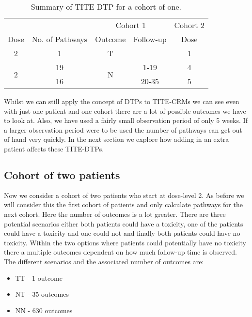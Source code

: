 \begin{table}[H]
	\centering
	\caption{Summary of TITE-DTP for a cohort of one.}
	\label{tab_tite-dtp:TITEDTP_c1_Sum}
	\begin{tabular}{ccccc}
		\hline
		\multicolumn{1}{l}{} &                 & \multicolumn{2}{c}{Cohort 1}   & Cohort 2 \\ 
		\cmidrule(l{3pt}r{3pt}){3-4} \cmidrule(l{3pt}r{3pt}){5-5}
		Dose                 & No. of Pathways & Outcome            & Follow-up & Dose     \\ \hline
		2                    & 1               & T                  &           & 1        \\ \hline
		\multirow{2}{*}{2}   & 19              & \multirow{2}{*}{N} & 1-19      & 4        \\
		& 16              &                    & 20-35     & 5        \\ \hline
	\end{tabular}
\end{table}

Whilst we can still apply the concept of DTPs to TITE-CRMs we can see even with just one patient and one cohort there are a lot of possible outcomes we have to look at. Also, we have used a fairly small observation period of only 5 weeks. If a larger observation period were to be used the number of pathways can get out of hand very quickly. In the next section we explore how adding in an extra patient affects these TITE-DTPs.  


\subsection{Cohort of two patients}
\label{tite-dtp:TITE-DTPs-c2}
Now we consider a cohort of two patients who start at dose-level 2. As before we will consider this the first cohort of patients and only calculate pathways for the next cohort. Here the number of outcomes is a lot greater. There are three potential scenarios either both patients could have a toxicity, one of the patients could have a toxicity and one could not and finally both patients could have no toxicity. Within the two options where patients could potentially have no toxicity there a multiple outcomes dependent on how much follow-up time is observed. The different scenarios and the associated number of outcomes are: 

\begin{itemize}
	\item TT - 1 outcome 
	\item NT - 35 outcomes 
	\item NN - 630 outcomes
\end{itemize}

